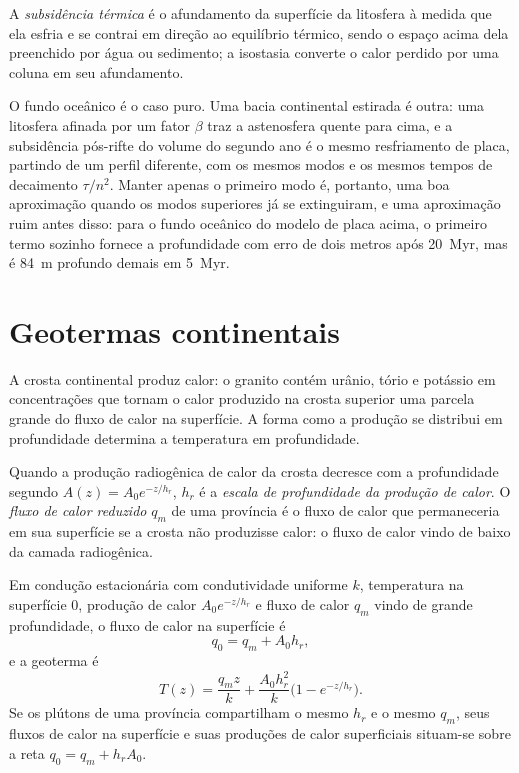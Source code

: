 \begin{definition}\label{def:b3:lithosphere-thermal-models:thermal-subsidence}
A \emph{subsidência térmica} é o afundamento da
superfície da litosfera à medida que ela esfria e se contrai em direção ao
equilíbrio térmico, sendo o espaço acima dela preenchido por água ou sedimento; a
isostasia converte o calor perdido por uma coluna em seu afundamento.
\end{definition}

O fundo oceânico é o caso puro. Uma bacia continental estirada é outra: uma
litosfera afinada por um fator $\beta$ traz a astenosfera quente para cima, e a
subsidência pós-rifte do volume do segundo ano é o mesmo resfriamento de placa, partindo
de um perfil diferente, com os mesmos modos e os mesmos tempos de decaimento $\tau/n^2$.
Manter apenas o primeiro modo é, portanto, uma boa aproximação quando os modos superiores
já se extinguiram, e uma aproximação ruim antes disso: para o fundo oceânico do modelo de
placa acima, o primeiro termo sozinho fornece a profundidade com erro de dois metros após
\qty{20}{Myr}, mas é \qty{84}{m} profundo demais em \qty{5}{Myr}.

\section{Geotermas continentais}

A crosta continental produz calor: o granito contém urânio, tório e potássio em
concentrações que tornam o calor produzido na crosta superior uma parcela grande do
fluxo de calor na superfície. A forma como a produção se distribui em profundidade
determina a temperatura em profundidade.

\begin{definition}\label{def:b3:lithosphere-thermal-models:reduced}
Quando a produção radiogênica de calor da crosta decresce com a profundidade segundo
$A(z) = A_0e^{-z/h_r}$, $h_r$ é a \emph{escala de profundidade da
produção de calor}. O \emph{fluxo de calor
reduzido} $q_m$ de uma província é o fluxo de calor que
permaneceria em sua superfície se a crosta não produzisse calor: o fluxo de calor vindo
de baixo da camada radiogênica.
\end{definition}

\begin{proposition}\label{prop:b3:lithosphere-thermal-models:exponential}
Em condução estacionária com condutividade uniforme $k$, temperatura na superfície $0$,
produção de calor $A_0e^{-z/h_r}$ e fluxo de calor $q_m$ vindo de grande profundidade, o
fluxo de calor na superfície é
\[
  q_0 = q_m + A_0h_r,
\]
e a geoterma é
\[
  T(z) = \frac{q_mz}{k} + \frac{A_0h_r^2}{k}\bigl(1 - e^{-z/h_r}\bigr).
\]
Se os plútons de uma província compartilham o mesmo $h_r$ e o mesmo $q_m$, seus fluxos
de calor na superfície e suas produções de calor superficiais situam-se sobre a reta
$q_0 = q_m + h_rA_0$.
\end{proposition}

